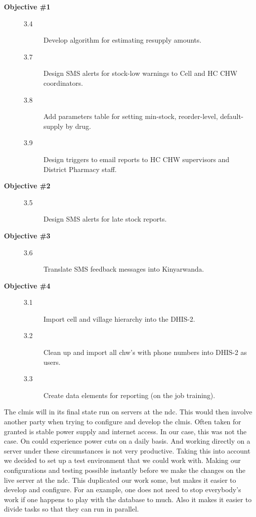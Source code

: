 \begin{description}
\item[\textbf{Objective \#1}]\hfill
	\begin{description}
	\item[3.4]Develop algorithm for estimating resupply amounts.
	\item[3.7]Design SMS alerts for stock-low warnings to Cell and HC CHW coordinators.
	\item[3.8]Add parameters table for setting min-stock, reorder-level, default-supply by drug.
	\item[3.9]Design triggers to email reports to HC CHW supervisors and District Pharmacy staff.
	\end{description}
\item[\textbf{Objective \#2}]\hfill
	\begin{description}
	\item[3.5]Design SMS alerts for late stock reports.
	\end{description}
\item[\textbf{Objective \#3}]\hfill
	\begin{description}
	\item[3.6]Translate SMS feedback messages into Kinyarwanda.
	\end{description}
\item[\textbf{Objective \#4}]\hfill 
	\begin{description}
	\item[3.1]Import cell and village hierarchy into the DHIS-2.
	\item[3.2]Clean up and import all \gls{chw}'s with phone numbers into DHIS-2 as users.
	\item[3.3]Create data elements for reporting (on the job training).
	\end{description}

\end{description}

The \gls{clmis} will in its final state run on servers at the \gls{ndc}.
This would then involve another party when trying to configure and develop the \gls{clmis}. 
Often taken for granted is stable power supply and internet access. 
In our case, this was not the case. On could experience power cuts on a daily basis.
And working directly on a server under these circumstances is not very productive. 
Taking this into account we decided to set up a test environment that we could work with. 
Making our configurations and testing possible instantly before we make the changes on the live server at the \gls{ndc}. 
This duplicated our work some, but makes it easier to develop and configure. For an example, one does not need to stop everybody's work if one happens to play with the database to much. Also it makes it easier to divide tasks so that they can run in parallel. 

